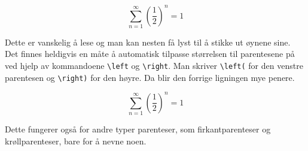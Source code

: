 \documentclass[a4paper, 11pt]{article}
\begin{document}
\begin{equation}
\sum_{n = 1}^\infty (\frac{1}{2})^n = 1
\end{equation}

Dette er vanskelig å lese og man kan nesten få lyst til å stikke ut øynene sine. Det finnes heldigvis en måte å automatisk tilpasse størrelsen til parentesene på ved hjelp av kommandoene \texttt{\textbackslash left} og \texttt{\textbackslash right}. Man skriver \texttt{\textbackslash left(} for den venstre parentesen og \texttt{\textbackslash right)} for den høyre. Da blir den forrige ligningen mye penere.

\begin{equation}
\sum_{n = 1}^\infty \left(\frac{1}{2}\right)^n = 1
\end{equation}

Dette fungerer også for andre typer parenteser, som firkantparenteser og krøllparenteser, bare for å nevne noen.
\end{document}
